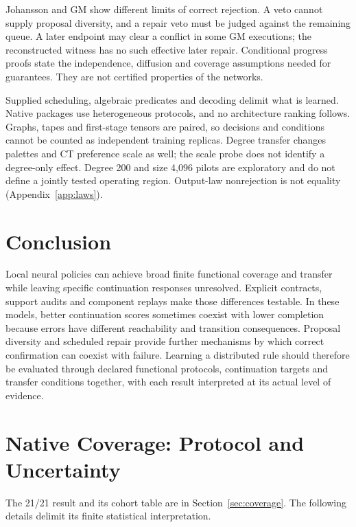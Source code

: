 \documentclass[10pt]{article}
\begin{document}
Johansson and GM show different limits of correct rejection. A veto cannot
supply proposal diversity, and a repair veto must be judged against the
remaining queue. A later endpoint may clear a conflict in some GM executions;
the reconstructed witness has no such effective later repair. Conditional
progress proofs state the independence, diffusion and coverage assumptions
needed for guarantees. They are not certified properties of the networks.

Supplied scheduling, algebraic predicates and decoding delimit what is
learned. Native packages use heterogeneous protocols, and no architecture
ranking follows. Graphs, tapes and first-stage tensors are paired, so
decisions and conditions cannot be counted as independent training replicas.
Degree transfer changes palettes and CT preference scale as well; the scale
probe does not identify a degree-only effect. Degree 200 and size 4,096 pilots
are exploratory and do not define a jointly tested operating region.
Output-law nonrejection is not equality (Appendix~\ref{app:laws}).

\section{Conclusion}
Local neural policies can achieve broad finite functional coverage and
transfer while leaving specific continuation responses unresolved. Explicit
contracts, support audits and component replays make those differences
testable. In these models, better continuation scores sometimes coexist
with lower completion because errors have different reachability and
transition consequences. Proposal diversity and scheduled repair provide
further mechanisms by which correct confirmation can coexist with failure.
Learning a distributed rule should therefore be evaluated through declared
functional protocols, continuation targets and transfer conditions together,
with each result interpreted at its actual level of evidence.

\appendix


\section{Native Coverage: Protocol and Uncertainty}\label{app:coverage}
The 21/21 result and its cohort table are in Section~\ref{sec:coverage}.
The following details delimit its finite statistical interpretation.
\end{document}
